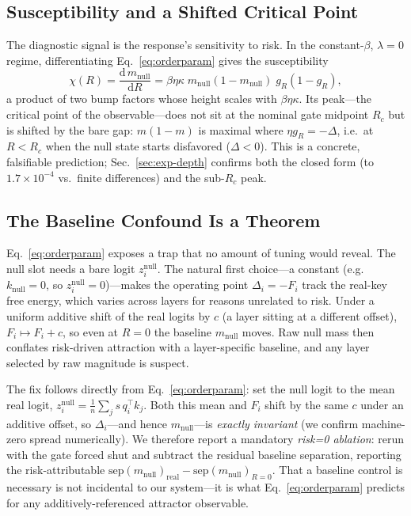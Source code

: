 \documentclass[letterpaper]{article} %
\begin{document}
\subsection{Susceptibility and a Shifted Critical Point}
\label{sec:theory-chi}
The diagnostic signal is the response's sensitivity to risk. In the constant-$\beta$,
$\lambda{=}0$ regime, differentiating Eq.~\eqref{eq:orderparam} gives the susceptibility
%
\begin{equation}
\chi(R)=\frac{\mathrm{d}\,m_{\text{null}}}{\mathrm{d}R}
= \beta\eta\kappa\; m_{\text{null}}(1-m_{\text{null}})\; g_R(1-g_R),
\label{eq:chi}
\end{equation}
%
a product of two bump factors whose height scales with $\beta\eta\kappa$. Its peak---the critical
point of the observable---does not sit at the nominal gate midpoint $R_c$ but is shifted by the
bare gap: $m(1-m)$ is maximal where $\eta g_R=-\Delta$, i.e.\ at $R<R_c$ when the null state starts
disfavored ($\Delta<0$). This is a concrete, falsifiable prediction; Sec.~\ref{sec:exp-depth}
confirms both the closed form (to $1.7\times10^{-4}$ vs.\ finite differences) and the sub-$R_c$
peak.

\subsection{The Baseline Confound Is a Theorem}
\label{sec:theory-confound}
Eq.~\eqref{eq:orderparam} exposes a trap that no amount of tuning would reveal. The null slot needs
a bare logit $z^{\text{null}}_i$. The natural first choice---a constant (e.g.\ $k_{\text{null}}=0$,
so $z^{\text{null}}_i=0$)---makes the operating point $\Delta_i=-F_i$ track the real-key free
energy, which varies across layers for reasons unrelated to risk. Under a uniform additive shift of
the real logits by $c$ (a layer sitting at a different offset), $F_i\mapsto F_i+c$, so even at
$R{=}0$ the baseline $m_{\text{null}}$ moves. Raw null mass then conflates risk-driven attraction
with a layer-specific baseline, and any layer selected by raw magnitude is suspect.

The fix follows directly from Eq.~\eqref{eq:orderparam}: set the null logit to the mean real logit,
$z^{\text{null}}_i=\frac1n\sum_j s\,q_i^\top k_j$. Both this mean and $F_i$ shift by the same $c$
under an additive offset, so $\Delta_i$---and hence $m_{\text{null}}$---is \emph{exactly invariant}
(we confirm machine-zero spread numerically). We therefore report a mandatory \emph{risk=0
ablation}: rerun with the gate forced shut and subtract the residual baseline separation, reporting
the risk-attributable $\mathrm{sep}(m_{\text{null}})_{\text{real}}-\mathrm{sep}(m_{\text{null}})_{R=0}$.
That a baseline control is necessary is not incidental to our system---it is what
Eq.~\eqref{eq:orderparam} predicts for any additively-referenced attractor observable.
\end{document}
